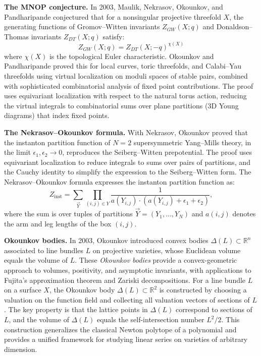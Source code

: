 \textbf{The MNOP conjecture.} In 2003, Maulik, Nekrasov, Okounkov, and Pandharipande conjectured that for a nonsingular projective threefold $X$, the generating functions of Gromov--Witten invariants $Z_{GW}(X; q)$ and Donaldson--Thomas invariants $Z_{DT}(X; q)$ satisfy:
\[
Z_{GW}(X; q) = Z_{DT}(X; -q)^{\chi(X)}
\]
where $\chi(X)$ is the topological Euler characteristic. Okounkov and Pandharipande proved this for local curves, toric threefolds, and Calabi--Yau threefolds using virtual localization on moduli spaces of stable pairs, combined with sophisticated combinatorial analysis of fixed point contributions. The proof uses equivariant localization with respect to the natural torus action, reducing the virtual integrals to combinatorial sums over plane partitions (3D Young diagrams) that index fixed points.

\textbf{The Nekrasov--Okounkov formula.} With Nekrasov, Okounkov proved that the instanton partition function of $N=2$ supersymmetric Yang--Mills theory, in the limit $\epsilon_1, \epsilon_2 \to 0$, reproduces the Seiberg--Witten prepotential. The proof uses equivariant localization to reduce integrals to sums over pairs of partitions, and the Cauchy identity to simplify the expression to the Seiberg--Witten form. The Nekrasov--Okounkov formula expresses the instanton partition function as:
\[
Z_{\text{inst}} = \sum_{\vec{Y}} \prod_{(i,j) \in Y} \frac{1}{a(Y_{i,j}) \cdot (a(Y_{i,j}) + \epsilon_1 + \epsilon_2)},
\]
where the sum is over tuples of partitions $\vec{Y} = (Y_1, \ldots, Y_N)$ and $a(i,j)$ denotes the arm and leg lengths of the box $(i,j)$.

\textbf{Okounkov bodies.} In 2003, Okounkov introduced convex bodies $\Delta(L) \subset \mathbb{R}^n$ associated to line bundles $L$ on projective varieties, whose Euclidean volume equals the volume of $L$. These \emph{Okounkov bodies} provide a convex-geometric approach to volumes, positivity, and asymptotic invariants, with applications to Fujita's approximation theorem and Zariski decompositions. For a line bundle $L$ on a surface $X$, the Okounkov body $\Delta(L) \subset \mathbb{R}^2$ is constructed by choosing a valuation on the function field and collecting all valuation vectors of sections of $L$. The key property is that the lattice points in $\Delta(L)$ correspond to sections of $L$, and the volume of $\Delta(L)$ equals the self-intersection number $L^2/2$. This construction generalizes the classical Newton polytope of a polynomial and provides a unified framework for studying linear series on varieties of arbitrary dimension.

